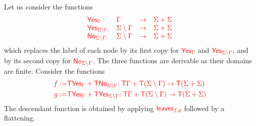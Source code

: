\begin{example}
Let us consider the functions 
$$\begin{array}{llll}
\ranked{\mathsf{Yes}_\rGamma :} & \rGamma &\ranked{\to} &\ranked{ \rSigma+\rSigma}\\%
 \ranked{\mathsf{Yes}_{\ranked{\rSigma\setminus\rGamma}:}}& \ranked{\rSigma\setminus\rGamma}&\ranked{\to} &\ranked{ \rSigma+\rSigma}\\
\ranked{\mathsf{No}_{\ranked{\rSigma\setminus\rGamma}: }}&\ranked{\rSigma\setminus\rGamma} &\ranked{\to}& \ranked{ \rSigma+\rSigma}
\end{array}$$
which replaces the label of each node by its first copy for ${\color{red}{\mathsf{Yes}_\Gamma}}$ and ${\color{red}{\mathsf{Yes}_{{\color{red}{\Sigma}}\setminus{\color{red}{\Gamma}}}}}$, and by its second copy for ${\color{red}{\mathsf{No}_{{\color{red}{\Sigma}}\setminus{\color{red}{\Gamma}}}}}$. The three functions are derivable as their domains are finite. 
Consider the functions 
\begin{align*}
{\color{red}{f:=}} &{\color{red}{ {\color{red}{\mathsf T}}\mathsf{Yes}_{\color{red}{\Gamma}}+{\color{red}{\mathsf T}}\mathsf{No}_{{\color{red}{\Sigma}}\setminus {\color{red}{\Gamma}}}}}{\color{red}{: {\color{red}{\mathsf T}}{\color{red}{\Gamma}}+{\color{red}{\mathsf T}}({\color{red}{\Sigma}}\setminus{\color{red}{\Gamma}}) \to {\color{red}{\mathsf T}}({\color{red}{\Sigma}}+{\color{red}{\Sigma}})}}
\\
{\color{red}{g:=}} & {\color{red}{ {\color{red}{\mathsf T}}\mathsf{Yes}_{\color{red}{\Gamma}}+{\color{red}{\mathsf T}}\mathsf{Yes}_{{\color{red}{\Sigma}}\setminus {\color{red}{\Gamma}}}}}{\color{red}{: {\color{red}{\mathsf T}}{\color{red}{\Gamma}}+{\color{red}{\mathsf T}}({\color{red}{\Sigma}}\setminus{\color{red}{\Gamma}}) \to {\color{red}{\mathsf T}}({\color{red}{\Sigma}}+{\color{red}{\Sigma}})}} 
\end{align*}
The descendant function is obtained by applying ${\color{red}{\mathsf{leaves}_{f,g}}}$ followed by a flattening.


\end{example}
